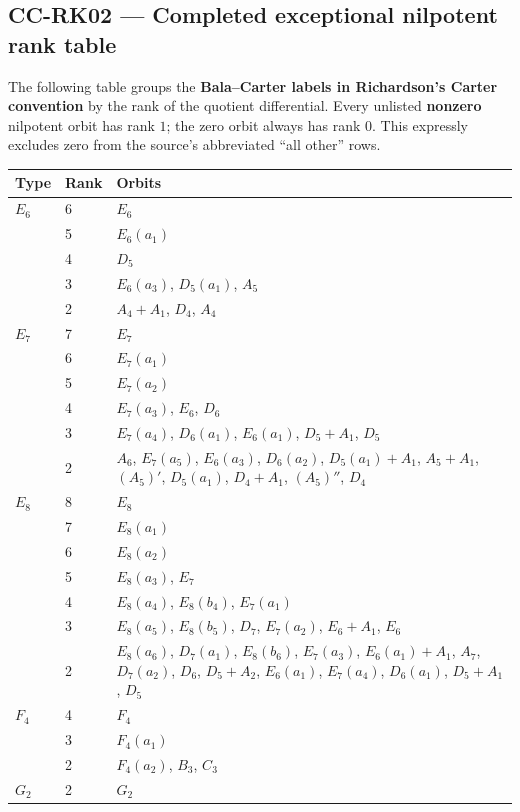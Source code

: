 \subsection{CC-RK02 --- Completed exceptional nilpotent rank table}\label{cc-rk02-completed-exceptional-nilpotent-rank-table}

The following table groups the \textbf{Bala--Carter labels in Richardson's Carter convention} by the rank of the quotient differential. Every unlisted \textbf{nonzero} nilpotent orbit has rank \(1\); the zero orbit always has rank \(0\). This expressly excludes zero from the source's abbreviated ``all other'' rows.

\begin{longtable}{@{}p{.08\linewidth}p{.08\linewidth}p{.74\linewidth}@{}}
\toprule\noalign{}
\begin{minipage}[b]{\linewidth}\raggedright
Type
\end{minipage} & \begin{minipage}[b]{\linewidth}\raggedleft
Rank
\end{minipage} & \begin{minipage}[b]{\linewidth}\raggedright
Orbits
\end{minipage} \\
\midrule\noalign{}
\endhead
\bottomrule\noalign{}
\endlastfoot
\(E_6\) & 6 & \(E_6\) \\
& 5 & \(E_6(a_1)\) \\
& 4 & \(D_5\) \\
& 3 & \(E_6(a_3)\), \(D_5(a_1)\), \(A_5\) \\
& 2 & \(A_4+A_1\), \(D_4\), \(A_4\) \\
\(E_7\) & 7 & \(E_7\) \\
& 6 & \(E_7(a_1)\) \\
& 5 & \(E_7(a_2)\) \\
& 4 & \(E_7(a_3)\), \(E_6\), \(D_6\) \\
& 3 & \(E_7(a_4)\), \(D_6(a_1)\), \(E_6(a_1)\), \(D_5+A_1\), \(D_5\) \\
& 2 & \(A_6\), \(E_7(a_5)\), \(E_6(a_3)\), \(D_6(a_2)\), \(D_5(a_1)+A_1\), \(A_5+A_1\), \((A_5)'\), \(D_5(a_1)\), \(D_4+A_1\), \((A_5)''\), \(D_4\) \\
\(E_8\) & 8 & \(E_8\) \\
& 7 & \(E_8(a_1)\) \\
& 6 & \(E_8(a_2)\) \\
& 5 & \(E_8(a_3)\), \(E_7\) \\
& 4 & \(E_8(a_4)\), \(E_8(b_4)\), \(E_7(a_1)\) \\
& 3 & \(E_8(a_5)\), \(E_8(b_5)\), \(D_7\), \(E_7(a_2)\), \(E_6+A_1\), \(E_6\) \\
& 2 & \(E_8(a_6)\), \(D_7(a_1)\), \(E_8(b_6)\), \(E_7(a_3)\), \(E_6(a_1)+A_1\), \(A_7\), \(D_7(a_2)\), \(D_6\), \(D_5+A_2\), \(E_6(a_1)\), \(E_7(a_4)\), \(D_6(a_1)\), \(D_5+A_1\), \(D_5\) \\
\(F_4\) & 4 & \(F_4\) \\
& 3 & \(F_4(a_1)\) \\
& 2 & \(F_4(a_2)\), \(B_3\), \(C_3\) \\
\(G_2\) & 2 & \(G_2\) \\
\end{longtable}

